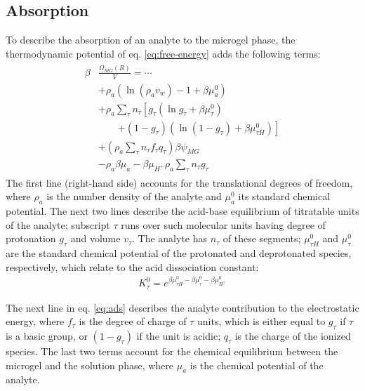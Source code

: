 \subsection{Absorption}




To describe the absorption of an analyte to the microgel phase, 
the thermodynamic potential of eq. \ref{eq:free-energy} adds the following terms:
%
%
\begin{align}
\begin{aligned}
\beta&\frac{\Omega_{MG}(R)}{V}= \cdots\\&+ \rho_a\left(\ln\left(\rho_a v_w\right) -1 + \beta\mu^0_a\right) \\
& + \rho_a \sum_\tau n_\tau  \left[g_\tau(\ln g_\tau+ \beta\mu^0_{\tau})\right.\\
&\qquad\left.+(1-g_\tau)(\ln (1-g_\tau)+\beta\mu^0_{\tau H})\right] \\
& +  \left( \rho_a \sum_\tau n_\tau f_\tau q_\tau\right)\beta\psi_{MG}\\
& -\rho_a\beta\mu_a
 -\beta\mu_{H^+} \rho_a \sum_\tau n_\tau g_\tau
\end{aligned}
\label{eq:ads}
\end{align}
%
\noindent The first line (right-hand side) accounts for the translational degrees of freedom,
where $\rho_a$ is the number density of the analyte and $\mu_a^0$ its standard chemical potential.
The next two lines describe the acid-base equilibrium of titratable units of the analyte;
subscript $\tau$ runs over such molecular units having degree of protonation $g_\tau$ and volume $v_\tau$.
The analyte has $n_\tau$ of these segments;
$\mu^0_{\tau H}$ and $\mu^0_\tau$ are the standard chemical potential of the protonated and deprotonated species, respectively, which relate to the acid dissociation constant:
%
\begin{align}
K^0_{\tau}= e^{\beta\mu^0_{\tau H}-\beta\mu^0_{\tau}-\beta\mu^0_{H^+}}
\end{align}
%

The next line in eq. \ref{eq:ads} describes the analyte contribution to the electrostatic energy, where $f_\tau$ is the degree of charge of $\tau$ units, which is either equal to $g_\tau$ if $\tau$ is a basic group, or $(1-g_\tau)$ if the unit is acidic; $q_\tau$ is the charge of the ionized species.
The last two terms account for the chemical equilibrium between the microgel and the solution phase, where $\mu_a$ is the chemical potential of the analyte.



